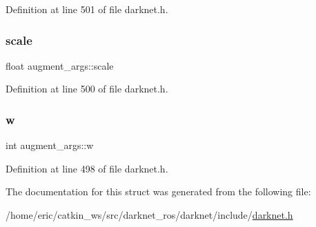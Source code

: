 Definition at line 501 of file darknet.\+h.

\mbox{\label{structaugment__args_a3bbc9156f890de21ce14876c552baaf2}} 
\subsubsection{\texorpdfstring{scale}{scale}}
{\footnotesize\ttfamily float augment\+\_\+args\+::scale}



Definition at line 500 of file darknet.\+h.

\mbox{\label{structaugment__args_a974bba52935c8bd5e95a306d1bd88acd}} 
\subsubsection{\texorpdfstring{w}{w}}
{\footnotesize\ttfamily int augment\+\_\+args\+::w}



Definition at line 498 of file darknet.\+h.



The documentation for this struct was generated from the following file\+:\begin{DoxyCompactItemize}
\item 
/home/eric/catkin\+\_\+ws/src/darknet\+\_\+ros/darknet/include/\mbox{\hyperlink{darknet_8h}{darknet.\+h}}\end{DoxyCompactItemize}
